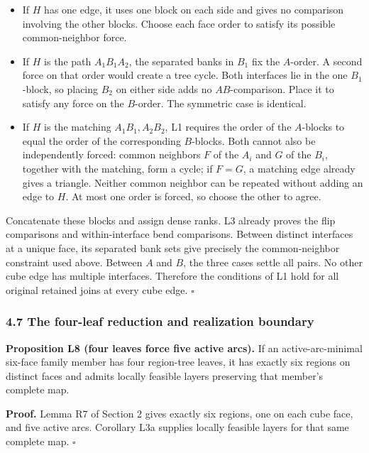 \documentclass[
  11pt,
]{article}
\providecommand{\tightlist}{%
  \setlength{\itemsep}{0pt}\setlength{\parskip}{0pt}}
\begin{document}
\begin{itemize}
\tightlist
\item
  If \(H\) has one edge, it uses one block on each side and gives no
  comparison involving the other blocks. Choose each face order to
  satisfy its possible common-neighbor force.
\item
  If \(H\) is the path \(A_1B_1A_2\), the separated banks in \(B_1\) fix
  the \(A\)-order. A second force on that order would create a tree
  cycle. Both interfaces lie in the one \(B_1\)-block, so placing
  \(B_2\) on either side adds no \(AB\)-comparison. Place it to satisfy
  any force on the \(B\)-order. The symmetric case is identical.
\item
  If \(H\) is the matching \(A_1B_1,A_2B_2\), L1 requires the order of
  the \(A\)-blocks to equal the order of the corresponding \(B\)-blocks.
  Both cannot also be independently forced: common neighbors \(F\) of
  the \(A_i\) and \(G\) of the \(B_i\), together with the matching, form
  a cycle; if \(F=G\), a matching edge already gives a triangle. Neither
  common neighbor can be repeated without adding an edge to \(H\). At
  most one order is forced, so choose the other to agree.
\end{itemize}

Concatenate these blocks and assign dense ranks. L3 already proves the
flip comparisons and within-interface bend comparisons. Between distinct
interfaces at a unique face, its separated bank sets give precisely the
common-neighbor constraint used above. Between \(A\) and \(B\), the
three cases settle all pairs. No other cube edge has multiple
interfaces. Therefore the conditions of L1 hold for all original
retained joins at every cube edge. \(\square\)

\subsubsection{4.7 The four-leaf reduction and realization
boundary}\label{the-four-leaf-reduction-and-realization-boundary}

\textbf{Proposition L8 (four leaves force five active arcs).} If an
active-arc-minimal six-face family member has four region-tree leaves,
it has exactly six regions on distinct faces and admits locally feasible
layers preserving that member's complete map.

\textbf{Proof.} Lemma R7 of Section 2 gives exactly six regions, one on
each cube face, and five active arcs. Corollary L3a supplies locally
feasible layers for that same complete map. \(\square\)
\end{document}
